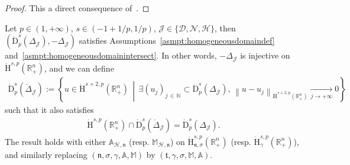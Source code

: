\documentclass[AHL,Unicode,longabstracts,published]{cedram}
\newcommand{\bbA}{\mathbb{A}}
\newcommand{\bbR}{\mathbb{R}}
\newcommand{\bbN}{\mathbb{N}}
\newcommand{\bbM}{\mathbb{M}}
\newcommand{\rmH}{\mathrm{H}}%
\newcommand{\rmD}{\mathrm{D}}
\newcommand{\clH}{\mathcal{H}}
\newcommand{\clN}{\mathcal{N}}
\newcommand{\clJ}{\mathcal{J}}
\newcommand{\clD}{\mathcal{D}}
\newcommand{\fkn}{\mathfrak{n}}
\newcommand{\fkt}{\mathfrak{t}}
\let\oldexists\exists
\renewcommand*{\exists}{\mathrel{\oldexists}}
\begin{document}
\begin{proof}
This a direct consequence of~\cite[Proposition~B.2, Coro\-llary~B.3]{Gaudin2022}.
\end{proof}


\begin{prop}\label{prop:assumptionsareCheckedforLap}
Let $p\in(1,+\infty)$, $s\in(-1+1/p,1/p)$, $\clJ\in\{\clD,\clN,\clH\}$, then $(\dot{\rmD}^{s}_{p}(\Delta_\clJ),-\Delta_\clJ)$ satisfies Assumptions~\ref{asmpt:homogeneousdomaindef} and~\ref{asmpt:homogeneousdomainintersect}. In other words, $-\Delta_\clJ$ is injective on $\dot{\rmH}^{s,p}(\bbR^n_+)$, and we can define
\begin{align*}
\dot{\rmD}^{s}_{p}\left(\mathring{\Delta}_\clJ\right):= \left\{ u\in \dot{\rmH}^{s+2,p}\left(\bbR^n_+\right)\,\middle|\,\exists (u_j)_{j\,\in\,\bbN}\subset\dot{\rmD}^{s}_{p}(\Delta_\clJ),\,\left\| u-u_j \right\|_{\dot{\rmH}^{s+2,p}\left(\bbR^n_+\right)} \xrightarrow[j\rightarrow +\infty]{} 0 \right\}
\end{align*}
such that it also satisfies
\begin{align}\label{eq:IntersectHomogeneousDomainsLap}
\dot{\rmH}^{s,p}\left(\bbR^n_+\right)\cap\dot{\rmD}^{s}_{p}\left(\mathring{\Delta}_\clJ\right) = \dot{\rmD}^{s}_{p}({\Delta}_\clJ).
\end{align}
The result holds with either $\bbA_{\clH,\fkn}$ (resp. $\bbM_{\clH,\fkn}$) on $\dot{\rmH}^{s,p}_{\fkn,\sigma}(\bbR^n_+)$ (resp. $\dot{\rmH}^{s,p}_{\gamma}(\bbR^n_+)$), and similarly replacing $(\fkn,\sigma,\gamma,\bbA,\bbM)$ by $(\fkt,\gamma,\sigma,\bbM,\bbA)$.
\end{prop}
\end{document}
